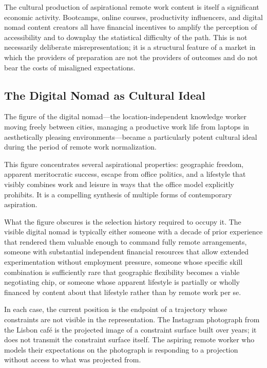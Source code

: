 \documentclass[12pt, a4paper]{article}
\theoremstyle{plain}
\theoremstyle{definition}
\theoremstyle{remark}
\begin{document}
The cultural production of aspirational remote work content is itself
a significant economic activity.
Bootcamps, online courses, productivity influencers, and digital nomad content creators
all have financial incentives to amplify the perception of accessibility
and to downplay the statistical difficulty of the path.
This is not necessarily deliberate misrepresentation;
it is a structural feature of a market in which the providers of preparation
are not the providers of outcomes and do not bear the costs of misaligned expectations.

\subsection{The Digital Nomad as Cultural Ideal}

The figure of the digital nomad---the location-independent knowledge worker
moving freely between cities, managing a productive work life from laptops
in aesthetically pleasing environments---became a particularly potent cultural ideal
during the period of remote work normalization.

This figure concentrates several aspirational properties: geographic freedom,
apparent meritocratic success, escape from office politics, and a lifestyle
that visibly combines work and leisure in ways that the office model explicitly prohibits.
It is a compelling synthesis of multiple forms of contemporary aspiration.

What the figure obscures is the selection history required to occupy it.
The visible digital nomad is typically either someone with a decade of prior experience
that rendered them valuable enough to command fully remote arrangements,
someone with substantial independent financial resources that allow extended
experimentation without employment pressure,
someone whose specific skill combination is sufficiently rare that
geographic flexibility becomes a viable negotiating chip,
or someone whose apparent lifestyle is partially or wholly financed
by content about that lifestyle rather than by remote work per se.

In each case, the current position is the endpoint of a trajectory
whose constraints are not visible in the representation.
The Instagram photograph from the Lisbon café is the projected image
of a constraint surface built over years; it does not transmit the constraint surface itself.
The aspiring remote worker who models their expectations on the photograph
is responding to a projection without access to what was projected from.
\end{document}
